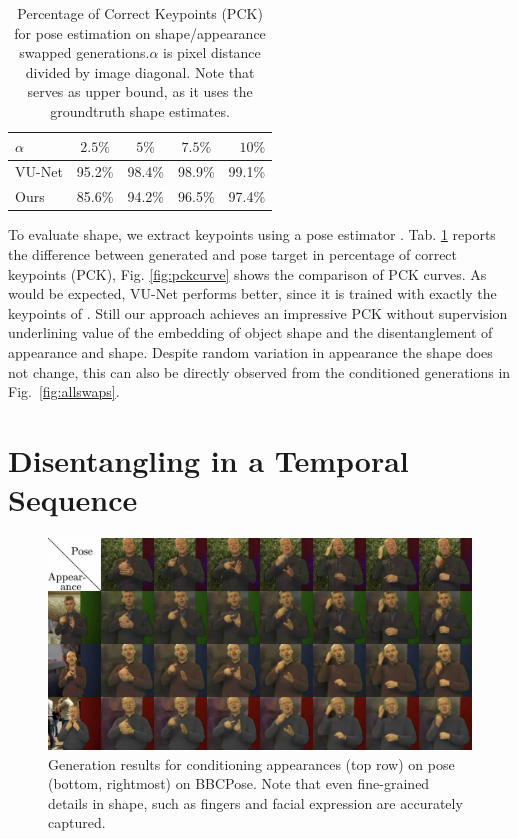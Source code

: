 		\begin{table}
			\centering
			\caption{Percentage of Correct Keypoints (PCK) for pose estimation on shape/appearance swapped generations.\;$\alpha$ is pixel distance divided by image diagonal. Note that \cite{esser18} serves as upper bound, as it uses the groundtruth shape estimates.}
			\label{tab:pose}
			\begin{tabular}{l|cccr}
				\hline
				$\alpha$ & $2.5\%$ &  $5\%$ & $7.5\%$ & $10\%$ \\ \hline
				VU-Net \cite{esser18} & {95.2}\% & {98.4}\% & {98.9}\% & {99.1}\% \\
				Ours & 85.6\% & 94.2\% &96.5\% & 97.4\% \\ \hline
			\end{tabular}
		\end{table}


		To evaluate shape, we extract keypoints using a pose estimator \cite{cao17affinityfield}. Tab. \ref{tab:pose} reports the difference between generated and pose target in percentage of correct keypoints (PCK), Fig. \ref{fig:pckcurve} shows the comparison of PCK curves. As would be expected, VU-Net performs better, since it is trained with exactly the keypoints of \cite{cao17affinityfield}. Still our approach achieves an impressive PCK without supervision underlining value of the embedding of object shape and the disentanglement of appearance and shape. Despite random variation in appearance the shape does not change, this can also be directly observed from the conditioned generations in Fig.~\ref{fig:allswaps}.



\section{Disentangling in a Temporal Sequence}\label{sec:videotovideo}

	\begin{figure}[t]
		\centering
		\includegraphics[trim={0cm 0cm 0cm 0cm},clip, width=1.\linewidth]{fig/factor/bbc_arrange}
		\caption{Generation results for conditioning appearances (top row) on pose (bottom, rightmost) on BBCPose.
		Note that even fine-grained details in shape, such as fingers and facial expression are accurately captured.}
		\label{fig:bbcthumb}
	\end{figure}



